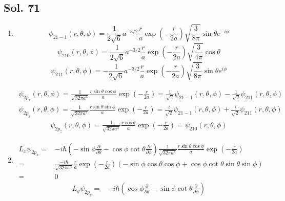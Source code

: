  \subsection*{Sol. 71}
 \begin{enumerate}
     \item 
     $$
     \psi_{21-1}(r,\theta,\phi)
     =\frac{1}{2\sqrt{6}}a^{-3/2}\frac{r}{a}\exp(-\frac{r}{2a})\sqrt{\frac{3}{8\pi}}\sin\theta e^{-i\phi}
     $$
     $$
     \psi_{210}(r,\theta,\phi)
     =\frac{1}{2\sqrt{6}}a^{-3/2}\frac{r}{a}\exp(-\frac{r}{2a})\sqrt{\frac{3}{4\pi}}\cos\theta
     $$
     $$
     \psi_{211}(r,\theta,\phi)
     =-\frac{1}{2\sqrt{6}}a^{-3/2}\frac{r}{a}\exp(-\frac{r}{2a})\sqrt{\frac{3}{8\pi}}\sin\theta e^{i\phi}
     $$

     \begin{align*}
         \psi_{2p_x}(r,\theta,\phi)
         =\frac{1}{\sqrt{32\pi a^3}}\frac{r\sin\theta\cos\phi}{a}\exp(-\frac{r}{2a})
         =
         \frac{1}{\sqrt{2}}\psi_{21-1}(r,\theta,\phi)
         -\frac{1}{\sqrt{2}}\psi_{211}(r,\theta,\phi)
     \end{align*}
     \begin{align*}
         \psi_{2p_y}(r,\theta,\phi)
         =\frac{1}{\sqrt{32\pi a^3}}\frac{r\sin\theta\sin\phi}{a}\exp(-\frac{r}{2a})
         =
         \frac{i}{\sqrt{2}}\psi_{21-1}(r,\theta,\phi)
         +\frac{i}{\sqrt{2}}\psi_{211}(r,\theta,\phi)
     \end{align*}
     \begin{align*}
         \psi_{2p_z}(r,\theta,\phi)
         =\frac{1}{\sqrt{32\pi a^3}}\frac{r\cos\theta}{a}\exp(-\frac{r}{2a})
         =\psi_{210}(r,\theta,\phi)
     \end{align*}
     \item 
     \begin{align*}
         L_x\psi_{2p_x}
         =&
         -i\hbar(-\sin\phi\frac{\partial}{\partial\theta}-\cos\phi\cot\theta\frac{\partial}{\partial\phi})
         \frac{1}{\sqrt{32\pi a^3}}\frac{r\sin\theta\cos\phi}{a}\exp(-\frac{r}{2a})\\
         =&
         \frac{-i\hbar}{\sqrt{32\pi a^3}}\frac{r}{a}\exp(-\frac{r}{2a})
         (-\sin\phi\cos\theta\cos\phi + \cos\phi\cot\theta\sin\theta\sin\phi)\\
         =&0
     \end{align*}
     \begin{align*}
         L_y\psi_{2p_y}
         =&
         -i\hbar(\cos\phi\frac{\partial}{\partial\theta}-\sin\phi\cot\theta\frac{\partial}{\partial\phi})

\end{align*}
\end{enumerate}

